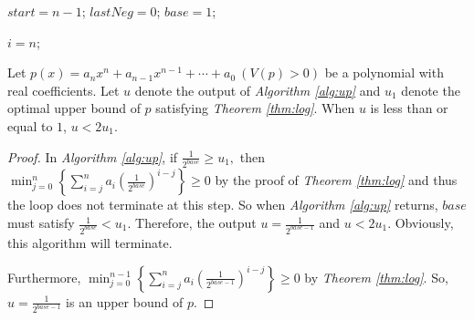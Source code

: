 \begin{algorithm}[H]
	\caption{\up \label{alg:up}}
	\DontPrintSemicolon
	$start=n-1$;
	$lastNeg=0$;
	$base=1$;\;
	
	
	
	$i=n$;\;

\end{algorithm}



\begin{theorem}
	\label{thm:two}
	Let $p(x)=a_nx^n+a_{n-1}x^{n-1}+\cdots+a_0\ (V(p)> 0)$ be a polynomial with real coefficients. Let  $u$ denote the output of {\em Algorithm \ref{alg:up}} and $u_1$ denote the optimal upper bound of $p$ satisfying
	{\em Theorem \ref{thm:log}}. When $u$ is less than or equal to $1$, $u<2u_1$.
	
\end{theorem}


\begin{proof}
	In {\em Algorithm \ref{alg:up}}, if  $\frac{1}{2^{base}}\ge u_1,$ then $\min_{j=0}^{n}\left\{ \sum_{i=j}^na_i\left( {\frac{1}{2^{base}} }
	\right)^{i-j}\right \}\ge 0$ by the proof of {\em Theorem \ref{thm:log}} and thus 
	the loop does not terminate at this step.
	So when {\em Algorithm \ref{alg:up}} returns, $base$ must satisfy $\frac{1}{2^{base}}<u_1$. Therefore, the output $u=\frac{1}{2^{base-1}}$ and $u<2u_1$.
	Obviously, this algorithm will terminate.
	
	Furthermore,  $\min_{j=0}^{n-1}\left\{ \sum_{i=j}^na_i\left( {\frac{1}{2^{base-1}} } \right)^{i-j}\right \}\ge 0$ by {\em Theorem \ref{thm:log}}. So, $u=\frac{1}{2^{base-1}}$ is an upper bound of $p$.
\end{proof}


